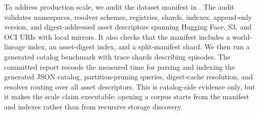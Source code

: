 To address production scale, we audit the dataset manifest in
. The audit validates
\ExpScaleNamespaceCount{} namespaces, \ExpScaleResolverCount{} resolver schemes,
\ExpScaleRegistryCount{} registries, \ExpScaleShardCount{} shards, \ExpScaleIndexCount{} indexes,
\ExpScaleVersionCount{} append-only version, and \ExpScaleAssetCount{} digest-addressed asset
descriptors spanning Hugging Face, S3, and OCI URIs with local mirrors.
It also checks that the manifest includes a world-lineage index, an asset-digest index, and a
split-manifest shard. We then run a generated catalog benchmark with
\ExpScaleTraceShardCount{} trace shards describing \ExpScaleEpisodeCapacity{} episodes. The
committed report records the measured time for parsing and indexing the generated JSON catalog,
\ExpScaleQueryCount{} partition-pruning queries, digest-cache resolution,
and resolver routing over all asset descriptors. This is catalog-side evidence only, but it makes
the scale claim executable: opening a corpus starts from the manifest and indexes rather than from
recursive storage discovery.
